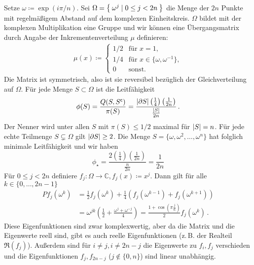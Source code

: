 \documentclass[ngerman,a4paper,11pt]{scrartcl}
\newcommand{\stcomp}[1]{{#1}^{\mathsf{c}}} %
\newcommand{\CC}{\mathbb{C}}
\DeclarePairedDelimiter{\abs}{\lvert}{\rvert}		%
\begin{document}
\begin{exmpbk}[Träge Irrfahrt auf dem $2n$\=/Zykel]
 Setze $\omega\coloneqq\exp(i\pi/n)$.
 Sei $\Omega=\Set{\omega^j\mid 0\leq j<2n}$ die Menge der $2n$ Punkte mit
 regelmäßigem Abstand auf dem komplexen Einheitskreis. $\Omega$ bildet mit der
 komplexen Multiplikation eine Gruppe und wir können eine Übergangsmatrix durch
 Angabe der Inkrementenverteilung $\mu$ definieren: 
 \begin{align*}
  \mu(x)\coloneqq
  \begin{cases}
   1/2&\text{für }x=1, \\
   1/4&\text{für }x\in\{\omega,\omega^{-1}\}, \\
   0&\text{sonst.}
  \end{cases}
 \end{align*}
 Die Matrix ist symmetrisch, also ist sie reversibel bezüglich der
 Gleichverteilung auf $\Omega$.
 Für jede Menge $S\subset\Omega$ ist die Leitfähigkeit
 \begin{equation*}
  \phi(S)=\frac{Q(S,\stcomp{S})}{\pi(S)}=\frac{\abs{\partial S}\left( \frac{1}{4} \right)\left( \frac{1}{2n} \right)}{\frac{\abs{S}}{2n}} \, .
 \end{equation*}
 Der Nenner wird unter allen $S$ mit $\pi(S)\leq 1/2$ maximal für $\abs{S}=n$.
 Für jede echte Teilmenge $S\subsetneq\Omega$ gilt $\abs{\partial S}\geq 2$.
 Die Menge $S=\{\omega,\omega^2,\dotsc,\omega^n\}$ hat folglich minimale
 Leitfähigkeit und wir haben
 \begin{equation}
  \label{eq:cyclestar}
  \phi_\star=\frac{2\left( \frac{1}{4} \right)\left( \frac{1}{2n} \right)}{\frac{n}{2n}}=\frac{1}{2n} 
 \end{equation}
 Für $0\leq j<2n$ definiere $f_j:\Omega\to\CC, f_j(x)\coloneqq x^j$.
 Dann gilt für alle $k\in\{0,\dotsc,2n-1\}$
 \begin{align*}
  Pf_j(\omega^k)&=\frac{1}{2}f_j(\omega^k)+\frac{1}{4}\left( f_j(\omega^{k-1})+f_j(\omega^{k+1}) \right) \\
  &=\omega^{jk}\left(\frac{1}{2} + \frac{\omega^j+\omega^{-j}}{4} \right)=\frac{1+\cos(\pi\frac{j}{n})}{2}f_j(\omega^k) \, .
 \end{align*}
 Diese Eigenfunktionen sind zwar komplexwertig, aber da die Matrix und die
 Eigenwerte reell sind, gibt es auch reelle Eigenfunktionen (z.\,B. der Realteil $\Re(f_j)$).
 Außerdem sind
 für $i\neq j, i\neq 2n-j$ die Eigenwerte zu $f_i,f_j$ verschieden und die
 Eigenfunktionen $f_j,f_{2n-j}$ ($j\notin\{0,n\}$) sind linear unabhängig.

\end{exmpbk}
\end{document}
